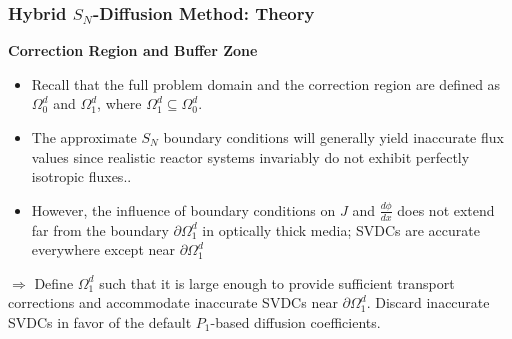 \begin{frame}
  \frametitle{Hybrid $S_N$-Diffusion Method: Theory}
  \textbf{Correction Region and Buffer Zone}
  \begin{itemize}
    \item Recall that the full problem domain and the correction region are defined as $\Omega^d_0$
      and $\Omega^d_1$, where $\Omega^d_1 \subseteq \Omega^d_0$.
    \item The approximate $S_N$ boundary conditions will generally yield inaccurate flux values
      since realistic reactor systems invariably do not exhibit perfectly isotropic fluxes..
    \item However, the influence of boundary conditions on $J$ and $\frac{d\phi}{dx}$ does not
      extend far from the boundary $\partial\Omega^d_1$ in optically thick media; SVDCs are
      accurate everywhere except near $\partial\Omega^d_1$
  \end{itemize}
  \pause
  $\Rightarrow$ Define $\Omega^d_1$ such that it is large enough to provide sufficient transport
  corrections and accommodate inaccurate SVDCs near $\partial\Omega^d_1$. Discard inaccurate SVDCs
  in favor of the default $P_1$-based diffusion coefficients.
\end{frame}

